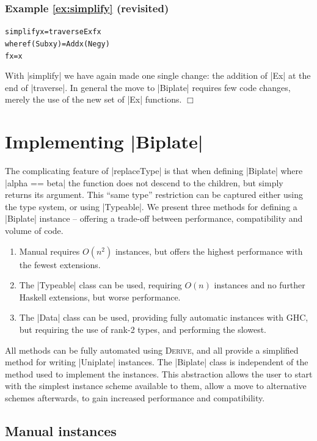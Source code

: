 \documentclass[preprint]{sigplanconf}
\newcommand{\noexample}{\hfill$\Box$}
\newenvironment{code}{\begin{alltt}\small}{\end{alltt}}
\newenvironment{revisit}[1]{\subsubsection*{Example #1 (revisited)}}{\noexample}
\newcommand{\derive}{\textsc{Derive}}
\begin{document}
\begin{revisit}{\ref{ex:simplify}}
\begin{code}
simplify x = traverseEx f x
    where  f (Sub x y)  = Add x (Neg y)
           f x          = x
\end{code}

With |simplify| we have again made one single change: the addition of |Ex| at the end of |traverse|. In general the move to |Biplate| requires few code changes, merely the use of the new set of |Ex| functions.
\end{revisit}

\section{Implementing |Biplate|}
\label{sec:implement_playex}

The complicating feature of |replaceType| is that when defining |Biplate| where |alpha == beta| the function does not descend to the children, but simply returns its argument. This ``same type'' restriction can be captured either using the type system, or using |Typeable|. We present three methods for defining a |Biplate| instance -- offering a trade-off between performance, compatibility and volume of code.

\begin{enumerate}
\item Manual requires $O(n^2)$ instances, but offers the highest performance with the fewest extensions.
\item The |Typeable| class can be used, requiring $O(n)$ instances and no further Haskell extensions, but worse performance.
\item The |Data| class can be used, providing fully automatic instances with GHC, but requiring the use of rank-2 types, and performing the slowest.
\end{enumerate}

All methods can be fully automated using \derive{}, and all provide a simplified method for writing |Uniplate| instances. The |Biplate| class is independent of the method used to implement the instances. This abstraction allows the user to start with the simplest instance scheme available to them, allow a move to alternative schemes afterwards, to gain increased performance and compatibility.

\subsection{Manual instances}
\end{document}
